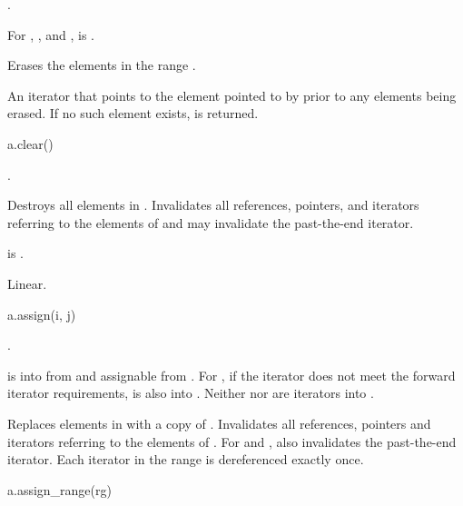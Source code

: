 \begin{itemdescr}
\pnum
\result
{}.

\pnum
\expects
For , , and ,
 is .

\pnum
\effects
Erases the elements in the range .

\pnum
\returns
An iterator that points to the element pointed to by 
prior to any elements being erased.
If no such element exists,  is returned.
\end{itemdescr}

%
\begin{itemdecl}
a.clear()
\end{itemdecl}

\begin{itemdescr}
\pnum
\result
{}.

\pnum
\effects
Destroys all elements in .
Invalidates all references, pointers, and iterators
referring to the elements of  and
may invalidate the past-the-end iterator.

\pnum
\ensures
{} is .

\pnum
\complexity
Linear.
\end{itemdescr}

%
\begin{itemdecl}
a.assign(i, j)
\end{itemdecl}

\begin{itemdescr}
\pnum
\result
{}.

\pnum
\expects
{} is  into  from 
and assignable from .
For ,
if the iterator does not meet
the forward iterator requirements,
 is also  into .
Neither  nor  are iterators into .

\pnum
\effects
Replaces elements in  with a copy of .
Invalidates all references, pointers and iterators
referring to the elements of .
For  and ,
also invalidates the past-the-end iterator.
Each iterator in the range  is dereferenced exactly once.
\end{itemdescr}

%
\begin{itemdecl}
a.assign_range(rg)
\end{itemdecl}

